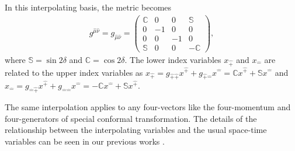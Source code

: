 \documentclass[aps,reprint,notitlepage,nofootinbib,superscriptaddress]{revtex4-1}
\begin{document}
 In this interpolating basis, the metric becomes
\begin{align}\label{eqn:g_munu_interpolation}
  g^{\hat{\mu}\hat{\nu}}
  = g_{\hat{\mu}\hat{\nu}}
  =
  \begin{pmatrix}
    \mathbb{C} & 0  & 0  & \mathbb{S} \\
    0 & -1 & 0  & 0 \\
    0 & 0  & -1 & 0 \\
    \mathbb{S} & 0  & 0  & -\mathbb{C}
  \end{pmatrix},
\end{align}
where $\mathbb{S}=\sin2\delta$ and $\mathbb{C}=\cos2\delta$. The lower index variables $x_{\hat{+}}$ and $x_{\hat{-}}$ are related to the upper index variables as $x_{\hat{+}}=g_{\hat{+}\hat{+}}x^{\hat{+}}+g_{\hat{+}\hat{-}}x^{\hat{-}}=\mathbb{C}x^{\hat{+}}+\mathbb{S}x^{\hat{-}}$ and $x_{\hat{-}}=g_{\hat{-}\hat{+}}x^{\hat{+}}+g_{\hat{-}\hat{-}}x^{\hat{-}}=-\mathbb{C}x^{\hat{-}}+\mathbb{S}x^{\hat{+}}$.

The same interpolation
applies to any four-vectors like the four-momentum and four-generators of special conformal transformation. The details of the relationship between the
interpolating variables and the usual space-time variables
can be seen in our previous works  \cite{Ji2001, Hornbostel1992, Ji1996, Ji2012, Ji2015EM, Ji2015SP, Ji2018QED, Ji2021QCD}.
\end{document}
